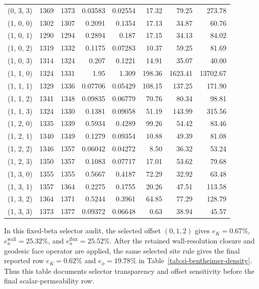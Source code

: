 \begin{table}[!htbp]
{\begin{tabular}{@{}lrrrrrrr@{}}
(0, 3, 3) & 1369 & 1373 & 0.03583 & 0.02554 & 17.32 & 79.25 & 273.78 \\
(1, 0, 0) & 1302 & 1307 & 0.2091 & 0.1354 & 17.13 & 34.87 & 60.76 \\
(1, 0, 1) & 1290 & 1294 & 0.2894 & 0.187 & 17.15 & 34.13 & 84.02 \\
(1, 0, 2) & 1319 & 1332 & 0.1175 & 0.07283 & 10.37 & 59.25 & 81.69 \\
(1, 0, 3) & 1314 & 1324 & 0.207 & 0.1221 & 14.91 & 35.07 & 40.00 \\
(1, 1, 0) & 1324 & 1331 & 1.95 & 1.309 & 198.36 & 1623.41 & 13702.67 \\
(1, 1, 1) & 1329 & 1336 & 0.07706 & 0.05429 & 108.15 & 137.25 & 171.90 \\
(1, 1, 2) & 1341 & 1348 & 0.09835 & 0.06779 & 70.76 & 80.34 & 98.81 \\
(1, 1, 3) & 1324 & 1330 & 0.1381 & 0.09058 & 51.19 & 143.99 & 315.56 \\
(1, 2, 0) & 1335 & 1339 & 0.5934 & 0.4289 & 99.26 & 54.42 & 83.46 \\
(1, 2, 1) & 1340 & 1349 & 0.1279 & 0.09354 & 10.88 & 49.39 & 81.08 \\
(1, 2, 2) & 1346 & 1357 & 0.06042 & 0.04272 & 8.50 & 36.32 & 53.24 \\
(1, 2, 3) & 1350 & 1357 & 0.1083 & 0.07717 & 17.01 & 53.62 & 79.68 \\
(1, 3, 0) & 1355 & 1355 & 0.5667 & 0.4187 & 72.29 & 32.92 & 63.48 \\
(1, 3, 1) & 1357 & 1364 & 0.2275 & 0.1755 & 20.26 & 47.51 & 113.58 \\
(1, 3, 2) & 1364 & 1371 & 0.5244 & 0.3961 & 64.85 & 77.29 & 128.79 \\
(1, 3, 3) & 1373 & 1377 & 0.09372 & 0.06648 & 0.63 & 38.94 & 45.57 \\
\bottomrule
\end{tabular}
}
\endgroup
\end{table}

\noindent In this fixed-beta selector audit, the selected offset \((0,1,2)\) gives \(e_K=0.67\%\), \(e_u^{\mathrm{wall}}=25.32\%\), and \(e_u^{\mathrm{flux}}=25.52\%\). After the retained wall-resolution closure and geodesic face operator are applied, the same selected site rule gives the final reported row \(e_K=0.62\%\) and \(e_\phi=19.78\%\) in Table~\ref{tab:si-bentheimer-density}. Thus this table documents selector transparency and offset sensitivity before the final scalar-permeability row.
